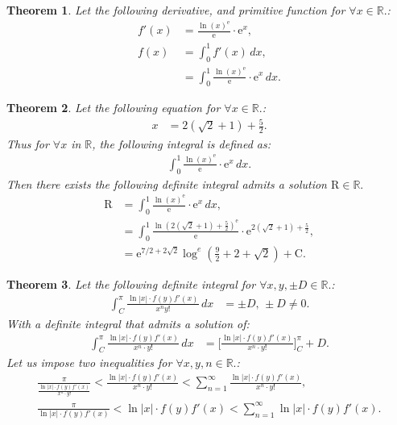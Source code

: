 \documentclass[10pt]{article}
\theoremstyle{plain}
\newtheorem{theorem}{Theorem}[section]
\theoremstyle{definition}
\theoremstyle{remark}
\begin{document}
\begin{theorem}
	Let the following derivative, and primitive function for $\forall x \in \mathbb{R}.$:
	\begin{align*}
		f'(x)&= \frac{\ln (x)^{\mathrm{e}}}{\mathrm{e}} \cdot \mathrm{e}^{x},\\
		f(x) &= \int_{0}^{1} f'(x)\, dx,\\
		&= \int_{0}^{1} \frac{\ln (x)^{\mathrm{e}}}{\mathrm{e}} \cdot \mathrm{e}^{x} \, dx.
	\end{align*}
\end{theorem}

\begin{theorem}
	Let the following equation for $\forall x \in \mathbb{R}.$:
	\begin{align*}
		x &= 2(\sqrt{2} + 1) + \frac{5}{2}.
	\end{align*}
	Thus for $\forall x$ in $\mathbb{R}$, the following integral is defined as:
	\begin{align*}
		\int_{0}^{1} \frac{\ln (x)^{\mathrm{e}}}{\mathrm{e}} \cdot \mathrm{e}^{x} \, dx.
	\end{align*}
	Then there exists the following definite integral admits a solution $\mathrm{R} \in \mathbb{R}.$
	\begin{align*}
		\mathrm{R} &= \int_{0}^{1} \frac{\ln (x)^{\mathrm{e}}}{\mathrm{e}} \cdot \mathrm{e}^{x} \, dx,\\
		&= \int_{0}^{1} \frac{\ln (2(\sqrt{2} + 1) + \frac{5}{2})^{\mathrm{e}}}{\mathrm{e}} \cdot \mathrm{e}^{2(\sqrt{2} + 1) + \frac{5}{2}},\\
		&= \mathrm{e}^{7/2+2 \sqrt{2}} \log^{e}(\frac{9}{2}+2+\sqrt{2}) + \mathrm{C}.
	\end{align*}
\end{theorem}

\begin{theorem}
	\label{theo:2.31}
	Let the following definite integral for $\forall x, y, \pm D \in \mathbb{R}.$:
	\begin{align*}
		\int_{C}^{\pi} \frac{ \ln |x| \cdot f(y)f'(x) }{x^{n}y!} \, dx &= \pm D, \, \pm D \neq 0.
	\end{align*}
	With a definite integral that admits a solution of:
	\begin{align*}
		\int_{C}^{\pi} \frac{ \ln |x| \cdot f(y)f'(x) }{x^{n} \cdot y!} \, dx &= \big[\frac{ \ln |x| \cdot f(y)f'(x) }{x^{n} \cdot y!}\big]_{C}^{\pi} + D.
	\end{align*}
	Let us impose two inequalities for $\forall x, y, n \in \mathbb{R}.$:
	\begin{align*}
		\frac{\pi}{\frac{ \ln |x| \cdot f(y)f'(x) }{x^{n} \cdot  y!}} < \frac{ \ln |x| \cdot f(y)f'(x) }{x^{n} \cdot y!} < \sum_{n=1}^{\infty} \frac{ \ln |x| \cdot f(y)f'(x) }{x^{n} \cdot y!},\\
	\frac{\pi}{\ln |x| \cdot f(y)f'(x) } < \ln |x| \cdot f(y)f'(x)  < \sum_{n=1}^{\infty} \ln |x| \cdot f(y)f'(x).
	\end{align*}
\end{theorem}
\end{document}
